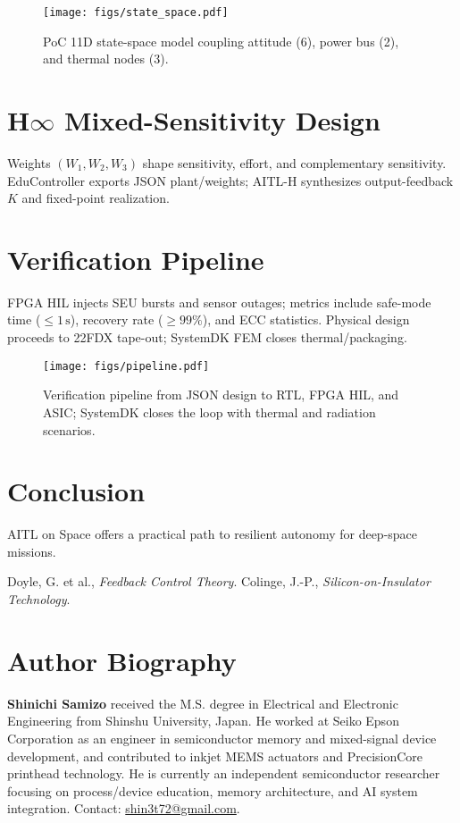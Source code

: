 \documentclass[conference]{IEEEtran}
\begin{document}
\begin{figure}[t]
  \centering
  \texttt{[image: figs/state\_space.pdf]}
  \caption{PoC 11D state-space model coupling attitude (6), power bus (2), and thermal nodes (3).}
  \label{fig:state_space}
\end{figure}

\section{H$\infty$ Mixed-Sensitivity Design}
Weights $(W_1,W_2,W_3)$ shape sensitivity, effort, and complementary sensitivity. EduController exports JSON plant/weights; AITL-H synthesizes output-feedback $K$ and fixed-point realization.

\section{Verification Pipeline}
FPGA HIL injects SEU bursts and sensor outages; metrics include safe-mode time ($\leq 1\,\mathrm{s}$), recovery rate ($\geq 99\%$), and ECC statistics. Physical design proceeds to 22FDX tape-out; SystemDK FEM closes thermal/packaging.

\begin{figure}[t]
  \centering
  \texttt{[image: figs/pipeline.pdf]}
  \caption{Verification pipeline from JSON design to RTL, FPGA HIL, and ASIC; SystemDK closes the loop with thermal and radiation scenarios.}
  \label{fig:pipeline}
\end{figure}

\section{Conclusion}
AITL on Space offers a practical path to resilient autonomy for deep-space missions.


\begin{thebibliography}{9}
 Doyle, G. et al., \emph{Feedback Control Theory}.
 Colinge, J.-P., \emph{Silicon-on-Insulator Technology}.
\end{thebibliography}

\section*{Author Biography}
\textbf{Shinichi Samizo} received the M.S. degree in Electrical and Electronic
Engineering from Shinshu University, Japan. He worked at Seiko Epson
Corporation as an engineer in semiconductor memory and mixed-signal
device development, and contributed to inkjet MEMS actuators and
PrecisionCore printhead technology. He is currently an independent
semiconductor researcher focusing on process/device education, memory
architecture, and AI system integration. Contact:
\href{mailto:shin3t72@gmail.com}{shin3t72@gmail.com}.
\end{document}
